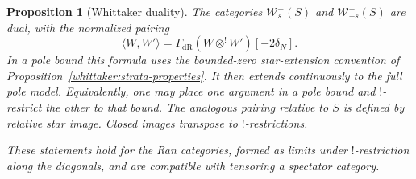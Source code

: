 \documentclass[11pt]{article}
\numberwithin{equation}{section}
\newtheorem{proposition}[theorem]{Proposition}
\theoremstyle{definition}
\theoremstyle{remark}
\begin{document}
\begin{proposition}[Whittaker duality]\label{whittaker:duality}
The categories $\mathcal W_s^+(S)$ and $\mathcal W_{-s}^-(S)$ are dual,
with the normalized pairing
\begin{equation}\label{eq:W2}
 \langle W,W'\rangle=
 \Gamma_{\mathrm{dR}}(W\otimes^!W')[-2\delta_N].
\end{equation}
In a pole bound this formula uses the bounded-zero star-extension
convention of Proposition~\ref{whittaker:strata-properties}. It then
extends continuously to the full pole model. Equivalently, one may place
one argument in a pole bound and $!$-restrict the other to that bound.
The analogous pairing relative to $S$ is defined by relative star image.
Closed images transpose to $!$-restrictions.

These statements hold for the Ran categories, formed as limits under
$!$-restriction along the diagonals, and are compatible with tensoring a
spectator category.
\end{proposition}
\end{document}
